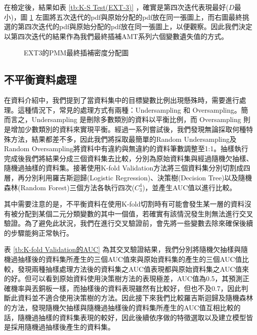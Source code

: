 \documentclass[12pt, a4paper]{article}
\begin{document}
\begin{enumerate}
\begin{enumerate}
在檢定後，結果如表 \ref{tb:K-S Test(EXT-3)} ，確實是第四次迭代表現最好($D$最小)，圖 \ref{fig:EXT3的PMM最終插補密度分配圖} 左圖將五次迭代的pdf與原始分配的pdf放在同一張圖上，而右圖最終挑選的第四次迭代的pdf與原始分配的pdf放在同一張圖上，以便觀察。因此我們決定以第四次迭代的結果作為我們最終插補AMT系列六個變數遺失值的方式。

\begin{figure}[h]
    \caption{EXT3的PMM最終插補密度分配圖}
    \label{fig:EXT3的PMM最終插補密度分配圖}
\end{figure}

\end{enumerate}
\end{enumerate}

\subsection{不平衡資料處理}

在資料介紹中，我們提到了當資料集中的目標變數比例出現懸殊時，需要進行處理。這種情況下，常見的處理方式有兩種：Undersampling 和 Oversampling。簡而言之，Undersampling 是刪除多數類別的資料以平衡比例，而 Oversampling 則是增加少數類別的資料來實現平衡。經過一系列嘗試後，我們發現無論採取何種特殊方法，結果都差不多，因此我們將採取最簡單的Random Undersampling及Random Oversampling將資料中有違約與無違約的資料筆數調整至1:1。抽樣執行完成後我們將結果分成三個資料集去比較，分別為原始資料集與經過隨機欠抽樣、隨機過抽樣的資料集。接著使用K-fold Validation方法將三個資料集分別切割成四層，再分別利用羅吉斯迴歸(Logistic Regression)、決策樹(Decision Tree)以及隨機森林(Random Forest)三個方法各執行四次($C^4_3$)，並產生AUC值以進行比較。

其中需要注意的是，不平衡資料在使用K-fold切割時有可能會發生某一層的資料沒有被分配到某個二元分類變數的其中一個值，若確實有該情況發生則無法進行交叉驗證。為了避免此狀況，我們在進行交叉驗證前，會先將一些變數去除來確保後續的步驟能夠正常執行。

表 \ref{tb:K-fold Validation的AUC} 為其交叉驗證結果，我們分別將隨機欠抽樣與隨機過抽樣後的資料集所產生的三個AUC值來與原始資料集的產生的三個AUC值比較，發現兩種抽樣處理方法後的資料集之AUC值表現都與原始資料集之AUC值來的好。但可以看到原始資料使用決策樹方法的表現極差，AUC值為0.5，其預測正確機率與丟銅板一樣，而抽樣後的資料表現雖然有比較好，但也不及0.7，因此判斷此資料並不適合使用決策樹的方法。因此接下來我們比較羅吉斯迴歸及隨機森林的方法，發現隨機欠抽樣與隨機過抽樣後的資料集所產生的AUC值互相比較的話，隨機過抽樣的資料集表現的較好，因此後續依序做的特徵選取以及建立模型皆是採用隨機過抽樣後產生的資料集。
\end{document}
